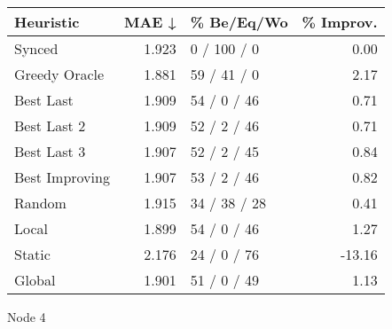 \begin{tabular}{lrlr}
\toprule
\textbf{Heuristic} & \textbf{MAE ↓} & \textbf{\% Be/Eq/Wo} & \textbf{\% Improv.} \\
\midrule
            Synced &          1.923 &          0 / 100 / 0 &                0.00 \\
     Greedy Oracle &          1.881 &          59 / 41 / 0 &                2.17 \\
         Best Last &          1.909 &          54 / 0 / 46 &                0.71 \\
       Best Last 2 &          1.909 &          52 / 2 / 46 &                0.71 \\
       Best Last 3 &          1.907 &          52 / 2 / 45 &                0.84 \\
    Best Improving &          1.907 &          53 / 2 / 46 &                0.82 \\
            Random &          1.915 &         34 / 38 / 28 &                0.41 \\
             Local &          1.899 &          54 / 0 / 46 &                1.27 \\
            Static &          2.176 &          24 / 0 / 76 &              -13.16 \\
            Global &          1.901 &          51 / 0 / 49 &                1.13 \\
\bottomrule
\end{tabular}
\caption{Node 4}
\label{tab:ds_iid_lr01_le2_bs2_4}
